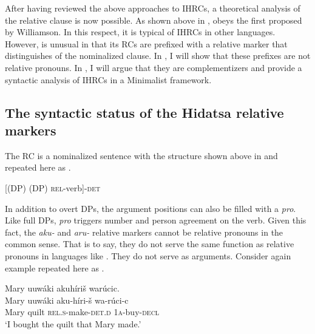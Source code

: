 \documentclass[output=paper]{LSP/langsci}
\begin{document}
After having reviewed the above approaches to IHRCs, a theoretical analysis of the  relative clause is now possible. As shown above in ,  obeys the  first proposed by Williamson. In this respect, it is typical of IHRCs in other languages. However,  is unusual in that its RCs are prefixed with a relative marker that distinguishes  of the nominalized clause. In , I will show that these prefixes are not relative pronouns. In , I will argue that they are complementizers and provide a syntactic analysis of IHRCs in a Minimalist framework.

\subsection{The syntactic status of the {Hidatsa} relative markers}\label{sec:boyle:5.1}

The  RC is a nominalized sentence with the structure shown above in  and repeated here as .

\ea  \label{boyle24}
{[(DP) (DP) \textsc{rel}-verb]-\textsc{det}}
\z


In addition to overt DPs, the argument positions can also be filled with a \textit{pro}. Like full DPs, \textit{pro} triggers number and person agreement on the verb. Given this fact, the \textit{aku-} and \textit{aru-} relative markers cannot be relative pronouns in the common sense. That is to say, they do not serve the same function as relative pronouns in languages like . They do not serve as arguments. Consider again example  repeated here as .

\ea \label{boyle25}
 \glll Mary uuwáki akuh\'iri\v{s} war\'ucic.\\
Mary uuwáki aku-h\'iri-\v{s}         wa-r\'uci-c\\
Mary quilt   \textsc{rel.s}-make-\textsc{det.d} \textsc{1a}-buy-\textsc{decl}\\
\trans `I bought the quilt that Mary made.' 
\z
\end{document}
